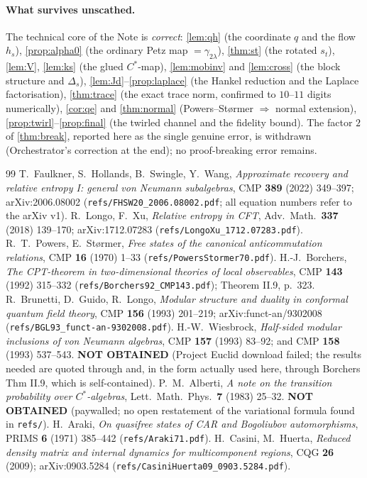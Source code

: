 \documentclass[11pt]{article}
\begin{document}
\paragraph{What survives unscathed.} The technical core of the Note is
\emph{correct}: \cref{lem:qh} (the coordinate $q$ and the flow $h_s$),
\cref{prop:alpha0} (the ordinary Petz map $=\gamma_{2\lambda}$),
\cref{thm:st} (the rotated $s_t$), \cref{lem:V}, \cref{lem:ks}
(the glued $C^*$-map), \cref{lem:mobinv} and \cref{lem:cross} (the block
structure and $\Delta_s$), \cref{lem:Jd}--\cref{prop:laplace} (the Hankel
reduction and the Laplace factorisation), \cref{thm:trace} (the exact trace
norm, confirmed to $10$--$11$ digits numerically), \cref{cor:qe} and
\cref{thm:normal} (Powers--St\o rmer $\Rightarrow$ normal extension),
\cref{prop:twirl}--\cref{prop:final} (the twirled channel and the fidelity
bound). The factor $2$ of \cref{thm:break}, reported here as the single genuine error, is withdrawn (Orchestrator's correction at the end); no proof-breaking error remains.

\begin{thebibliography}{99}
 T.~Faulkner, S.~Hollands, B.~Swingle, Y.~Wang,
 \emph{Approximate recovery and relative entropy I: general von Neumann
 subalgebras}, CMP \textbf{389} (2022) 349--397; arXiv:2006.08002
 (\texttt{refs/FHSW20\_2006.08002.pdf}; all equation numbers refer to the arXiv v1).
 R.~Longo, F.~Xu, \emph{Relative entropy in CFT}, Adv.\ Math.\
 \textbf{337} (2018) 139--170; arXiv:1712.07283 (\texttt{refs/LongoXu\_1712.07283.pdf}).
\bibitem{PS} R.~T.~Powers, E.~St\o rmer, \emph{Free states of the canonical
 anticommutation relations}, CMP \textbf{16} (1970) 1--33
 (\texttt{refs/PowersStormer70.pdf}).
 H.-J.~Borchers, \emph{The CPT-theorem in two-dimensional
 theories of local observables}, CMP \textbf{143} (1992) 315--332
 (\texttt{refs/Borchers92\_CMP143.pdf}); Theorem II.9, p.~323.
 R.~Brunetti, D.~Guido, R.~Longo, \emph{Modular structure and
 duality in conformal quantum field theory}, CMP \textbf{156} (1993) 201--219;
 arXiv:funct-an/9302008 (\texttt{refs/BGL93\_funct-an-9302008.pdf}).
\bibitem{Wiesbrock} H.-W.~Wiesbrock, \emph{Half-sided modular inclusions of von
 Neumann algebras}, CMP \textbf{157} (1993) 83--92; and CMP \textbf{158} (1993)
 537--543. \textbf{NOT OBTAINED} (Project Euclid download failed; the results
 needed are quoted through \cite[\S4.2]{FHSW} and, in the form actually used
 here, through Borchers \cite{Borchers} Thm II.9, which is self-contained).
\bibitem{Alberti} P.~M.~Alberti, \emph{A note on the transition probability over
 $C^*$-algebras}, Lett.\ Math.\ Phys.\ \textbf{7} (1983) 25--32.
 \textbf{NOT OBTAINED} (paywalled; no open restatement of the variational
 formula found in \texttt{refs/}).
 H.~Araki, \emph{On quasifree states of CAR and Bogoliubov
 automorphisms}, PRIMS \textbf{6} (1971) 385--442 (\texttt{refs/Araki71.pdf}).
\bibitem{CH09} H.~Casini, M.~Huerta, \emph{Reduced density matrix and internal
 dynamics for multicomponent regions}, CQG \textbf{26} (2009);
 arXiv:0903.5284 (\texttt{refs/CasiniHuerta09\_0903.5284.pdf}).
\end{thebibliography}
\end{document}
